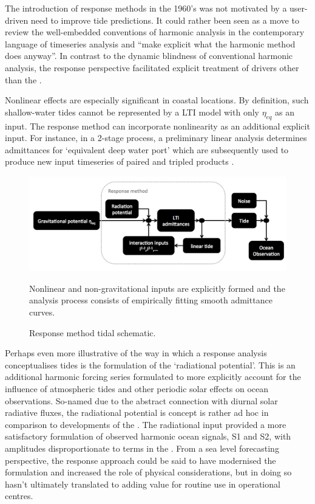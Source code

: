 The introduction of response methods in the 1960's was not motivated by a user-driven need to improve tide predictions.  It could rather been seen as a move to review the well-embedded conventions of harmonic analysis in the contemporary language of timeseries analysis and ``make explicit what the harmonic method does anyway''\citep[pp 540]{Munk:1966ts}.  In contrast to the dynamic blindness of conventional harmonic analysis, the response perspective facilitated explicit treatment of drivers other than the \ATGP{}.

Nonlinear effects are especially significant in coastal locations.   By definition, such shallow-water tides cannot be represented by a LTI model with only $\eta_{eq}$ as an input.  The response method can incorporate nonlinearity as an additional explicit input.    For instance,  in a 2-stage process, a preliminary linear analysis determines admittances for `equivalent deep water port' which are subsequently used to produce new input timeseries of paired and tripled products \citep[pp 122]{Pugh:1996uz}.
\begin{figure}[!hbt] \centering
    \includegraphics[width=\figwidthBig]{figures/diagrams/response_analysis_flowchart.png}
    \caption{Response method tidal schematic.}
    {Nonlinear and non-gravitational inputs are explicitly formed and the analysis process consists of empirically fitting smooth admittance curves.}
\label{fig:response}
\end{figure}
Perhaps even more illustrative of the way in which a response analysis conceptualises tides is the formulation of the `radiational potential'.   This is an additional harmonic forcing series formulated to more explicitly account for the influence of atmospheric tides and other periodic solar effects on ocean observations. So-named due to the abstract connection with diurnal solar radiative fluxes, the radiational potential is concept is rather ad hoc in comparison to developments of the \ATGP{}.  
The radiational input provided a more satisfactory formulation of observed harmonic ocean signals, S1 and S2, with amplitudes disproportionate to terms in the \ATGP{}.
From a sea level forecasting perspective, the response approach could be said to have modernised the formulation and increased the role of physical considerations, but in doing so hasn't ultimately translated to adding value for routine use in operational centres.



